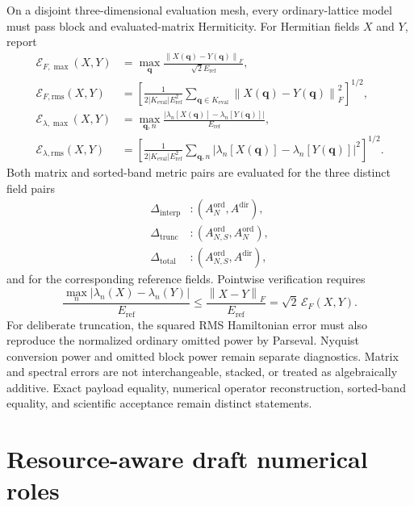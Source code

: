 \documentclass[11pt]{article}
\newcommand{\norm}[1]{\left\lVert #1\right\rVert}
\begin{document}
On a disjoint three-dimensional evaluation mesh, every ordinary-lattice model must pass
block and evaluated-matrix Hermiticity. For Hermitian fields $X$ and $Y$, report
\begin{align}
 \mathcal E_{F,\max}(X,Y)
 &=\max_{\mathbf q}\frac{\norm{X(\mathbf q)-Y(\mathbf q)}_F}{\sqrt{2}E_{\mathrm{ref}}},\\
 \mathcal E_{F,\mathrm{rms}}(X,Y)
 &=\left[
 \frac{1}{2|K_{\mathrm{eval}}|E_{\mathrm{ref}}^2}
 \sum_{\mathbf q\in K_{\mathrm{eval}}}
 \norm{X(\mathbf q)-Y(\mathbf q)}_F^2
 \right]^{1/2},\\
 \mathcal E_{\lambda,\max}(X,Y)
 &=\max_{\mathbf q,n}
 \frac{|\lambda_n[X(\mathbf q)]-\lambda_n[Y(\mathbf q)]|}{E_{\mathrm{ref}}},\\
 \mathcal E_{\lambda,\mathrm{rms}}(X,Y)
 &=\left[
 \frac{1}{2|K_{\mathrm{eval}}|E_{\mathrm{ref}}^2}
 \sum_{\mathbf q,n}
 |\lambda_n[X(\mathbf q)]-\lambda_n[Y(\mathbf q)]|^2
 \right]^{1/2}.
\end{align}
Both matrix and sorted-band metric pairs are evaluated for the three distinct field
pairs
\begin{align}
 \Delta_{\mathrm{interp}}&:
 (A_N^{\mathrm{ord}},A^{\mathrm{dir}}),\\
 \Delta_{\mathrm{trunc}}&:
 (A_{N,S}^{\mathrm{ord}},A_N^{\mathrm{ord}}),\\
 \Delta_{\mathrm{total}}&:
 (A_{N,S}^{\mathrm{ord}},A^{\mathrm{dir}}),
\end{align}
and for the corresponding reference fields. Pointwise verification requires
\begin{equation}
 \frac{\max_n|\lambda_n(X)-\lambda_n(Y)|}{E_{\mathrm{ref}}}
 \le\frac{\norm{X-Y}_F}{E_{\mathrm{ref}}}
 =\sqrt{2}\,\mathcal E_F(X,Y).
\end{equation}
For deliberate truncation, the squared RMS Hamiltonian error must also reproduce
the normalized ordinary omitted power by Parseval.
Nyquist conversion power and omitted block power remain separate diagnostics. Matrix and
spectral errors are not interchangeable, stacked, or treated as algebraically additive.
Exact payload equality, numerical operator reconstruction, sorted-band equality, and
scientific acceptance remain distinct statements.

\section{Resource-aware draft numerical roles}
\end{document}
